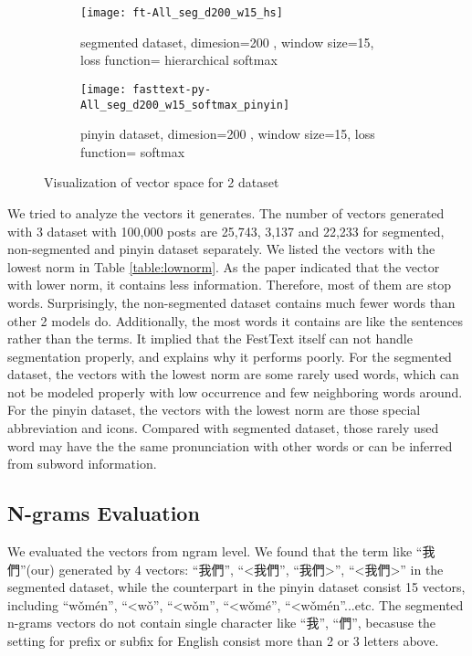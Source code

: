 \begin{figure}[H]
    \centering     
    \begin{subfigure}[b]{0.6\textwidth}
        \centering
        \texttt{[image: ft-All\_seg\_d200\_w15\_hs]}
        \caption{segmented dataset, dimesion=200 , window size=15, loss function=  hierarchical softmax}
    \end{subfigure}
    \begin{subfigure}[b]{0.6\textwidth}
        \centering
        \texttt{[image: fasttext-py-All\_seg\_d200\_w15\_softmax\_pinyin]}
        \caption{pinyin dataset,  dimesion=200 , window size=15, loss function= softmax}
    \end{subfigure}
    \caption{Visualization of vector space for 2 dataset}
    \label{tsne}
\end{figure}

We tried to analyze the vectors it generates. The number of vectors generated with 3 dataset with 100,000 posts are 25,743, 3,137 and 22,233 for segmented, non-segmented and pinyin dataset separately. 
We listed the vectors with the lowest norm in Table \ref{table:lownorm}. As the paper indicated that the vector with lower norm, it contains less information. 
Therefore, most of them are stop words. Surprisingly, the non-segmented dataset contains much fewer words than other 2 models do. 
Additionally, the most words it contains are like the sentences rather than the terms. It implied that the FestText itself can not handle segmentation properly, and explains why it performs poorly. 
For the segmented dataset, the vectors with the lowest norm are some rarely used words, which can not be modeled properly with low occurrence and few neighboring words around.
For the pinyin dataset, the vectors with the lowest norm are those special abbreviation and icons. Compared with segmented dataset, those rarely used word may have the the same pronunciation with other words or can be inferred from subword information.


\subsection{N-grams Evaluation}

We evaluated the vectors from ngram level. We found that the term like \enquote{我們}(our) generated by 4 vectors: \enquote{我們}, \enquote{\textless 我們}, \enquote{我們\textgreater}, \enquote{\textless 我們\textgreater} in the segmented dataset,
while the counterpart in the pinyin dataset consist 15 vectors, including \enquote{wǒmén}, \enquote{\textless wǒ}, \enquote{\textless wǒm}, \enquote{\textless wǒmé}, \enquote{\textless wǒmén}...etc. 
The segmented n-grams vectors do not contain single character like \enquote{我}, \enquote{們}, becasuse the setting for prefix or subfix for English consist more than 2 or 3 letters above.

